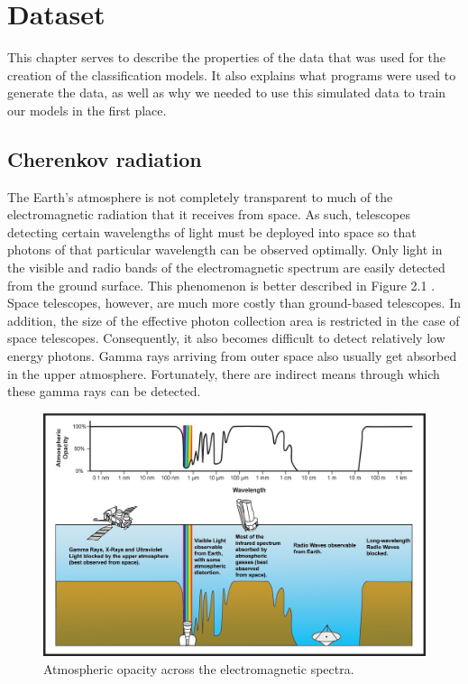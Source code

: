 \documentclass[a4paper, 12pt]{report}
\theoremstyle{definition}
\begin{document}
\chapter{Dataset}

This chapter serves to describe the properties of the data that was used for the creation of the classification models. It also explains what programs were used to generate the data, as well as why we needed to use this simulated data to train our models in the first place.

\section{Cherenkov radiation}

The Earth's atmosphere is not completely transparent to much of the electromagnetic radiation that it receives from space. As such, telescopes detecting certain wavelengths of light must be deployed into space so that photons of that particular wavelength can be observed optimally. Only light in the visible and radio bands of the electromagnetic spectrum are easily detected from the ground surface. This phenomenon is better described in Figure 2.1 \autocite{opacity}. Space telescopes, however, are much more costly than ground-based telescopes. In addition, the size of the effective photon collection area is restricted in the case of space telescopes. Consequently, it also becomes difficult to detect relatively low energy photons. Gamma rays arriving from outer space also usually get absorbed in the upper atmosphere. Fortunately, there are indirect means through which these gamma rays can be detected.

\begin{figure}[h!]
  \centering
  \includegraphics[scale=0.95]{im/atmosphericopacity.jpg}
  \caption{Atmospheric opacity across the electromagnetic spectra.}
  \label{fig:atmopacity}
\end{figure}
\end{document}

